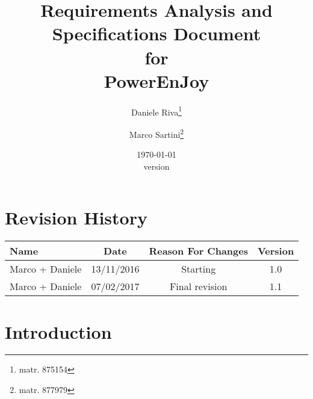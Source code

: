 \documentclass{scrreprt}
\title{Requirements Analysis and Specifications Document\\for\\PowerEnJoy}
\date{\today\\\bigskip version \version}
\author{Daniele Riva\thanks{matr. 875154}\and Marco Sartini\thanks{matr. 877979}}
\def\myversion{1.0 }
\begin{document}
\pagestyle{headings}
\maketitle

\begin{comment}
\begin{flushright}
    \rule{16cm}{5pt}\vskip1cm
    \begin{bfseries}
        \Huge{SOFTWARE REQUIREMENTS\\ SPECIFICATION}\\
        \vspace{1.9cm}
        for\\
        \vspace{1.9cm}
        Power EnJoy\\
        \vspace{1.5cm}
        \LARGE{Version \myversion approved}\\
        \vspace{1.5cm}
        Prepared by\\Marco Sartini (877979) and Daniele Riva (875154)\\
        \vspace{1.5cm}
        Politecnico di Milano\\
        \vspace{1.9cm}
        \today\\
    \end{bfseries}
\end{flushright}
\end{comment}

\tableofcontents


\chapter*{Revision History}

\begin{center}
    \begin{tabular}{lccc}
        \toprule
	   \textbf{ Name }& \textbf{ Date  }& \textbf{ Reason For Changes }& \textbf{ Version}\\
        \midrule
	    Marco + Daniele & 13/11/2016 & Starting & 1.0\\
		Marco + Daniele & 07/02/2017 & Final revision & 1.1\\
	\bottomrule
    \end{tabular}
\end{center}

\chapter{Introduction}
\end{document}
